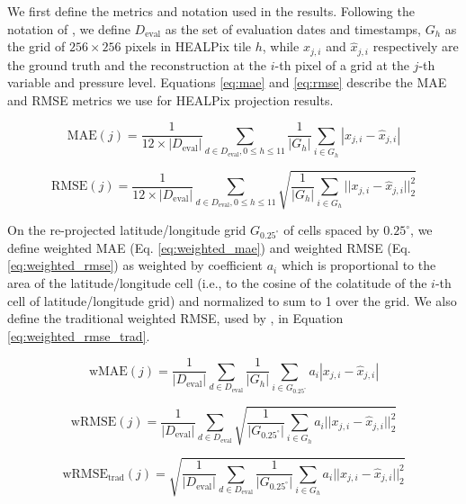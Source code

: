 We first define the metrics and notation used in the results. Following the notation of \cite{lam2023graphcast}, we define $D_{\text{eval}}$ as the set of evaluation dates and timestamps, $G_h$ as the grid of $256 \times 256$ pixels in HEALPix tile $h$, while $x_{j,i}$ and $\hat x_{j,i}$ respectively are the ground truth and the reconstruction at the $i$-th pixel of a grid at the $j$-th variable and pressure level. Equations \ref{eq:mae} and \ref{eq:rmse} describe the MAE and RMSE metrics we use for HEALPix projection results.

\begin{equation}
    \text{MAE} (j) = \frac{1}{12 \times | D_{\text{eval}} |} \sum _{d \in D_{\text{eval}}, 0 \leq h \leq 11} \frac{1}{| G_h |} \sum _{i \in G_h} | x_{j,i} - \hat x_{j,i} |
    \label{eq:mae}
\end{equation}

\begin{equation}
    \text{RMSE} (j) = \frac{1}{12 \times | D_{\text{eval}} |} \sum _{d \in D_{\text{eval}}, 0 \leq h \leq 11} \sqrt{\frac{1}{| G_h |} \sum _{i \in G_h} || x_{j,i} - \hat x_{j,i} ||_2^2}
    \label{eq:rmse}
\end{equation}

On the re-projected latitude/longitude grid $G_{0.25^\circ}$ of cells spaced by $0.25^\circ$, we define weighted MAE (Eq. \ref{eq:weighted_mae}) and weighted RMSE (Eq. \ref{eq:weighted_rmse}) as weighted by coefficient $a_i$ which is proportional to the area of the latitude/longitude cell (i.e., to the cosine of the colatitude of the $i$-th cell of latitude/longitude grid) and normalized to sum to 1 over the grid. We also define the traditional weighted RMSE, used by \citet{huang2022compressing}, in Equation \ref{eq:weighted_rmse_trad}.

\begin{equation}
    \text{wMAE} (j) = \frac{1}{| D_{\text{eval}} |} \sum _{d \in D_{\text{eval}}} \frac{1}{| G_h |} \sum _{i \in G_{0.25^\circ}} a_i | x_{j,i} - \hat x_{j,i} |
    \label{eq:weighted_mae}
\end{equation}

\begin{equation}
    \text{wRMSE} (j) = \frac{1}{| D_{\text{eval}} |} \sum _{d \in D_{\text{eval}}} \sqrt{\frac{1}{| G_{0.25^\circ} |} \sum _{i \in G_h} a_i || x_{j,i} - \hat x_{j,i} ||_2^2}
    \label{eq:weighted_rmse}
\end{equation}

\begin{equation}
    \text{wRMSE}_{\text{trad}} (j) = \sqrt{\frac{1}{| D_{\text{eval}} |} \sum _{d \in D_{\text{eval}}} \frac{1}{| G_{0.25^\circ} |} \sum _{i \in G_h} a_i || x_{j,i} - \hat x_{j,i} ||_2^2}
    \label{eq:weighted_rmse_trad}
\end{equation}


